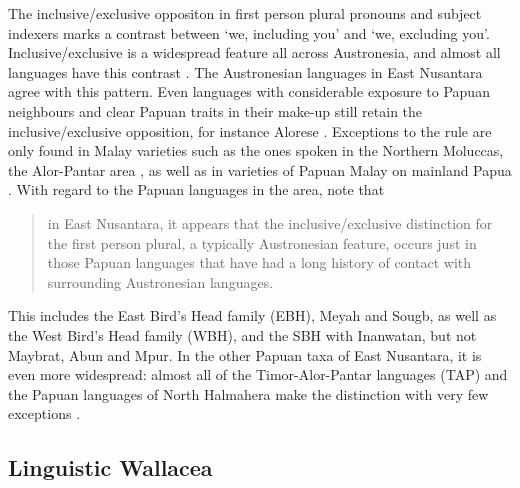 The inclusive/exclusive oppositon in first person plural pronouns and subject indexers marks a contrast between `we, including you' and `we, excluding you'. Inclusive/exclusive is a widespread feature all across Austronesia, and almost all languages have this contrast \citep{Tryon1995,klamer2008east}. The Austronesian languages in East Nusantara agree with this pattern. Even languages with considerable exposure to Papuan neighbours and clear Papuan traits in their make-up still retain the inclusive/exclusive opposition, for instance Alorese \citep{klamer2011alorese}. Exceptions to the rule are only found in Malay varieties such as the ones spoken in the Northern Moluccas, the Alor-Pantar area \citep{klamer2008east}, as well as in varieties of Papuan Malay on mainland Papua \citep{kluge2014grammar}. With regard to the Papuan languages in the area, \citet[115]{klamer2008east} note that \begin{quote}in East Nusantara, it appears that the inclusive/exclusive distinction for the first person plural, a typically Austronesian feature,
occurs just in those Papuan languages that have had a long history of contact with surrounding Austronesian languages.\end{quote}
This includes the East Bird's Head family (EBH), Meyah and Sougb, as well as the West Bird's Head family (WBH), and the SBH with Inanwatan, but not Maybrat, Abun and Mpur. In the other Papuan taxa of East Nusantara, it is even more widespread: almost all of the Timor-Alor-Pantar languages (TAP) and the Papuan languages of North Halmahera make the distinction with very few exceptions \citep[115]{klamer2008east}. 

\subsection{Linguistic Wallacea}\label{sec:wallacea}

